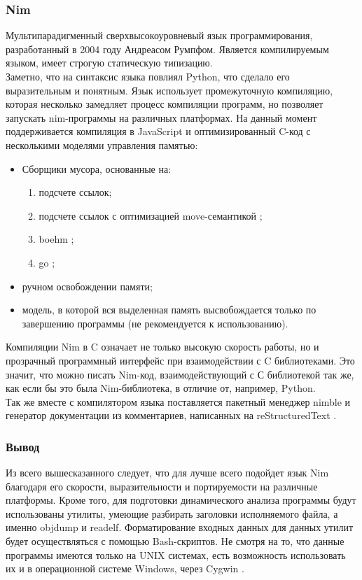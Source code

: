 \subsubsection{Nim}\label{sec:ch2/sec1/sub1/sub3}
Мультипарадигменный сверхвысокоуровневый 
язык программирования, разработанный в 2004 году Андреасом Румпфом.
Является компилируемым языком, имеет строгую статическую типизацию.\\
Заметно, что на синтаксис языка повлиял Python, что сделало его
выразительным и понятным. Язык использует промежуточную компиляцию, которая несколько
замедляет процесс компиляции программ, но позволяет запускать nim-программы на различных
платформах. На данный момент поддерживается компиляция в JavaScript \autocite{javascript}
и оптимизированный C-код с несколькими моделями управления памятью:\\
\begin{itemize}
    \item Сборщики мусора, основанные на:
        \begin{enumerate}[label={\arabic*)}]
            \item подсчете ссылок;
            \item подсчете ссылок с оптимизацией move-семантикой \autocite{nim-gc-move};
            \item boehm \autocite{boehm-gc};
            \item go \autocite{go-gc};
        \end{enumerate}
    \item ручном освобождении памяти;
    \item модель, в которой вся выделенная память высвобождается только по завершению программы
        (не рекомендуется к использованию).
\end{itemize}
Компиляции Nim в C означает не только высокую скорость работы, но и прозрачный программный интерфейс при взаимодействии с
C библиотеками. Это значит, что можно писать Nim-код, взаимодействующий с С библиотекой так же, как
если бы это была Nim-библиотека, в отличие от, например, Python.\\
Так же вместе с компилятором языка поставляется пакетный менеджер nimble \autocite{nimble} и генератор
документации из комментариев, написанных на reStructuredText \autocite{restructuredtext}.

\subsubsection{Вывод}\label{sec:ch2/sec1/sub1/sub4}
Из всего вышесказанного следует, что для {\ProgModule} лучше всего подойдет язык Nim
благодаря его скорости, выразительности и портируемости на различные платформы.
Кроме того, для подготовки динамического анализа программы будут использованы утилиты, умеющие разбирать
заголовки исполняемого файла, а именно objdump и readelf. Форматирование входных данных для данных утилит
будет осуществляться с помощью Bash-скриптов. Не смотря на то, что данные программы имеются только на UNIX системах,
есть возможность использовать их и в операционной системе Windows, через Cygwin \autocite{cygwin}.

